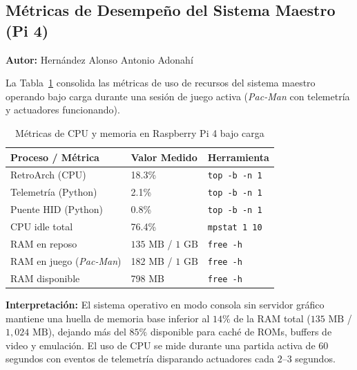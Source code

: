 
\subsection{Métricas de Desempeño del Sistema Maestro (Pi 4)}
\textbf{Autor:} Hernández Alonso Antonio Adonahí

La Tabla~\ref{tab:metricas_pi4} consolida las métricas de uso de recursos del sistema maestro operando bajo carga durante una sesión de juego activa (\textit{Pac-Man} con telemetría y actuadores funcionando).

\begin{table}[H]
	\centering
	\caption{Métricas de CPU y memoria en Raspberry Pi 4 bajo carga}
	\label{tab:metricas_pi4}
	\footnotesize
	\begin{tabular}{|p{2.8cm}|p{2.5cm}|p{1.9cm}|}
		\hline
		\textbf{Proceso / Métrica} & \textbf{Valor Medido} & \textbf{Herramienta} \\
		\hline
		RetroArch (CPU) & 18.3\% & \texttt{top -b -n 1} \\
		\hline
		Telemetría (Python) & 2.1\% & \texttt{top -b -n 1} \\
		\hline
		Puente HID (Python) & 0.8\% & \texttt{top -b -n 1} \\
		\hline
		CPU idle total & 76.4\% & \texttt{mpstat 1 10} \\
		\hline
		\hline
		RAM en reposo & $135\text{ MB}$ / $1\text{ GB}$ & \texttt{free -h} \\
		\hline
		RAM en juego (\textit{Pac-Man}) & 182 MB / $1\text{ GB}$ & \texttt{free -h} \\
		\hline
		RAM disponible & 798 MB & \texttt{free -h} \\
		\hline
	\end{tabular}
\end{table}

\textbf{Interpretación:} El sistema operativo en modo consola sin servidor gráfico mantiene una huella de memoria base inferior al $14\%$ de la RAM total ($135\text{ MB}$ / $1{,}024\text{ MB}$), dejando más del $85\%$ disponible para caché de ROMs, buffers de video y emulación. El uso de CPU se mide durante una partida activa de 60 segundos con eventos de telemetría disparando actuadores cada $2\text{--}3$ segundos.

